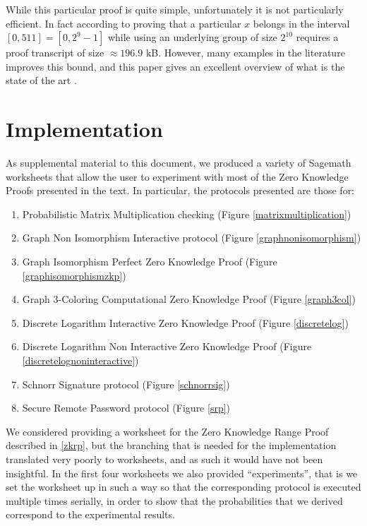 \documentclass{article}
\begin{document}
While this particular proof is quite simple, unfortunately it is not particularly efficient. In fact according to \cite{boudotEfficientProofsThat2000}
proving that a particular $x$ belongs in the interval $[0, 511] = [0, 2^9 -1]$ while using an underlying group of size $2^{10}$ requires a proof
transcript of size $\approx 196.9$ kB. However, many examples in the literature improves this bound, and this paper gives
an excellent overview of what is the state of the art \cite{moraisSurveyZeroKnowledge2019}.

\section{Implementation}
\label{implementation}
As supplemental material to this document, we produced a variety of Sagemath worksheets that allow the user to experiment
with most of the Zero Knowledge Proofs presented in the text. In particular, the protocols presented are those for:
\begin{enumerate}
    \item Probabilistic Matrix Multiplication checking (Figure \ref{matrixmultiplication})
    \item Graph Non Isomorphism Interactive protocol (Figure \ref{graphnonisomorphism})
    \item Graph Isomorphism Perfect Zero Knowledge Proof (Figure \ref{graphisomorphismzkp})
    \item Graph 3-Coloring Computational Zero Knowledge Proof (Figure \ref{graph3col})
    \item Discrete Logarithm Interactive Zero Knowledge Proof (Figure \ref{discretelog})
    \item Discrete Logarithm Non Interactive Zero Knowledge Proof (Figure \ref{discretelognoninteractive})
    \item Schnorr Signature protocol (Figure \ref{schnorrsig})
    \item Secure Remote Password protocol (Figure \ref{srp})
\end{enumerate}

We considered providing a worksheet for the Zero Knowledge Range Proof described in \ref{zkrp}, but the branching that
is needed for the implementation translated very poorly to worksheets, and as such it would have not been insightful.
In the first four worksheets we also provided \enquote{experiments}, that is we set the worksheet up in such a way so that the corresponding
protocol is executed multiple times serially, in order to show that the probabilities that we derived correspond to
the experimental results.
\end{document}
